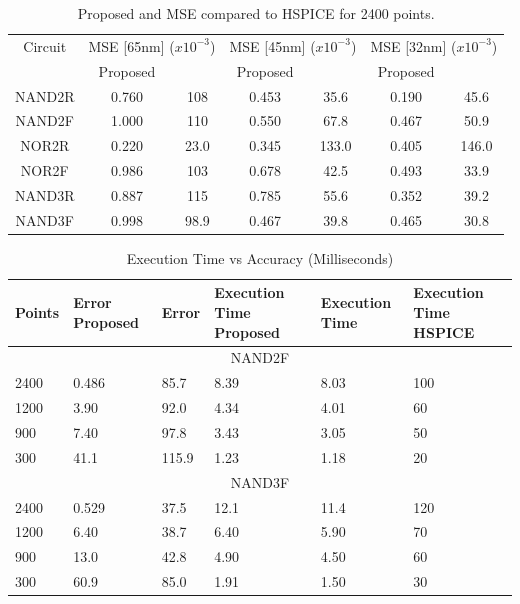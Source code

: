 \begin{table}[!htbp]
	\begin{center}
		\caption{Proposed and \cite{Accurate_Masking} MSE compared to HSPICE for 2400 points.}
		\label{table:pt}
		\begin{tabular}{|c|c|c|c|c|c|c|}
			\hline
			Circuit & \multicolumn{2}{c|}{MSE [65nm] ($x10^{-3}$)} & \multicolumn{2}{c|}{MSE [45nm] ($x10^{-3}$)} & \multicolumn{2}{c|}{MSE [32nm] ($x10^{-3}$)} \\ 
			\cline{2-7}
			& Proposed & \cite{Accurate_Masking} & Proposed & \cite{Accurate_Masking} & Proposed & \cite{Accurate_Masking}\\
			\hline
			NAND2R & 0.760 & 108 & 0.453 & 35.6 & 0.190 & 45.6 \\
			\hline
			NAND2F & 1.000 & 110 & 0.550 & 67.8 & 0.467 & 50.9 \\
			\hline
			NOR2R & 0.220 & 23.0 & 0.345 & 133.0 & 0.405 &146.0 \\
			\hline
			NOR2F & 0.986 & 103 & 0.678 & 42.5 & 0.493 & 33.9 \\
			\hline
			NAND3R & 0.887 & 115 & 0.785 & 55.6 & 0.352 & 39.2 \\
			\hline
			NAND3F & 0.998 & 98.9 & 0.467 & 39.8 & 0.465 & 30.8 \\
			\hline
		\end{tabular}
	\end{center}
\end{table}

\begin{table}[!htbp]
	\begin{center}
			\caption{Execution Time vs Accuracy (Milliseconds)}
			\label{table:extime}
			\begin{tabular}{|m{5em}|m{5em}|m{5em}|m{5em}|m{5em}|m{5em}|}
				\hline
				Points & Error \newline Proposed & Error \cite{Accurate_Masking} & Execution Time Proposed & Execution Time \cite{Accurate_Masking} & Execution Time HSPICE \\
				\hline
				\multicolumn{6}{|c|}{NAND2F} \\
				\hline
				2400 & 0.486 & 85.7 & 8.39 & 8.03 & 100\\
				\hline
				1200 & 3.90 & 92.0 & 4.34 & 4.01 & 60 \\
				\hline
				900 & 7.40 & 97.8 & 3.43 & 3.05 & 50 \\
				\hline
				300 & 41.1 & 115.9 & 1.23 & 1.18 & 20 \\
				\hline
				\multicolumn{6}{|c|}{NAND3F} \\
				\hline
				2400 & 0.529 & 37.5 & 12.1 & 11.4 & 120\\
				\hline
				1200 & 6.40 & 38.7 & 6.40 & 5.90 & 70 \\
				\hline
				900 & 13.0 & 42.8 & 4.90 & 4.50 & 60 \\
				\hline
				300 & 60.9 & 85.0 & 1.91 & 1.50 & 30 \\
				\hline
			\end{tabular}
	\end{center}
\end{table}

